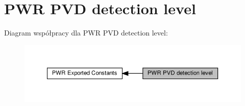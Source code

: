 \hypertarget{group___p_w_r___p_v_d__detection__level}{}\section{P\+WR P\+VD detection level}
\label{group___p_w_r___p_v_d__detection__level}
Diagram współpracy dla P\+WR P\+VD detection level\+:\nopagebreak
\begin{figure}[H]
\begin{center}
\leavevmode
\includegraphics[width=350pt]{group___p_w_r___p_v_d__detection__level}
\end{center}
\end{figure}
